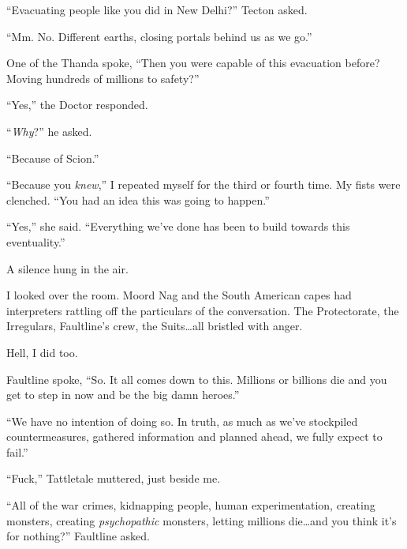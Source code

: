 ``Evacuating people like you did in New Delhi?''  Tecton asked.



``Mm.  No.  Different earths, closing portals behind us as we go.''



One of the Thanda spoke, ``Then you were capable of this evacuation before?  Moving hundreds of millions to safety?''



``Yes,'' the Doctor responded.



``\emph{Why}?'' he asked.



``Because of Scion.''



``Because you \emph{knew},'' I repeated myself for the third or fourth time.  My fists were clenched.  ``You had an idea this was going to happen.''



``Yes,'' she said.  ``Everything we've done has been to build towards this eventuality.''



A silence hung in the air.



I looked over the room.  Moord Nag and the South American capes had interpreters rattling off the particulars of the conversation.  The Protectorate, the Irregulars, Faultline's crew, the Suits\ldots all bristled with anger.



Hell, I did too.



Faultline spoke, ``So.  It all comes down to this.  Millions or billions die and you get to step in now and be the big damn heroes.''



``We have no intention of doing so.  In truth, as much as we've stockpiled countermeasures, gathered information and planned ahead, we fully expect to fail.''



``Fuck,'' Tattletale muttered, just beside me.



``All of the war crimes, kidnapping people, human experimentation, creating monsters, creating \emph{psychopathic }monsters, letting millions die\ldots and you think it's for nothing?''  Faultline asked.



